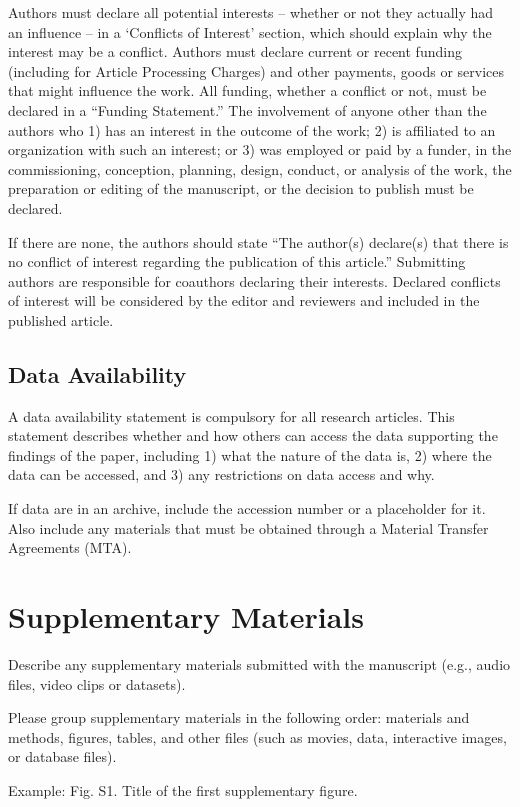 \documentclass{article}
\begin{document}
Authors must declare all potential interests – whether or not they actually had an influence – in a ‘Conflicts of Interest’ section, which should explain why the interest may be a conflict. Authors must declare current or recent funding (including for Article Processing Charges) and other payments, goods or services that might influence the work. All funding, whether a conflict or not, must be declared in a ``Funding Statement.'' The involvement of anyone other than the authors who 1) has an interest in the outcome of the work; 2) is affiliated to an organization with such an interest; or 3) was employed or paid by a funder, in the commissioning, conception, planning, design, conduct, or analysis of the work, the preparation or editing of the manuscript, or the decision to publish must be declared.

If there are none, the authors should state ``The author(s) declare(s) that there is no conflict of interest regarding the publication of this article.'' Submitting authors are responsible for coauthors declaring their interests. Declared conflicts of interest will be considered by the editor and reviewers and included in the published article.

\subsection*{Data Availability}
A data availability statement is compulsory for all research articles. This statement describes whether and how others can access the data supporting the findings of the paper, including 1) what the nature of the data is, 2) where the data can be accessed, and 3) any restrictions on data access and why.

If data are in an archive, include the accession number or a placeholder for it. Also include any materials that must be obtained through a Material Transfer Agreements (MTA). 

\section*{Supplementary Materials}
Describe any supplementary materials submitted with the manuscript (e.g., audio files, video clips or datasets). 

Please group supplementary materials in the following order: materials and methods, figures, tables, and other files (such as movies, data, interactive images, or database files). 

\medskip Example:
Fig. S1. Title of the first supplementary figure.
\end{document}
